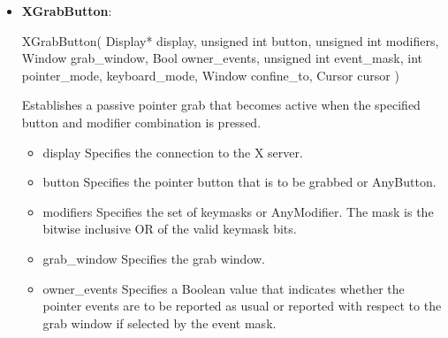 \documentclass{report}
\begin{document}
\begin{itemize}
\begin{cppcode}
{                    unsigned long serial;   /* # of last request processed by server */
                    Bool send_event;        /* true if this came from a SendEvent request */
                    Display *display;       /* Display the event was read from */
                    Window window;          /* ‘‘event’’ window it is reported relative to */
                    Window root;            /* root window that the event occurred on */
                    Window subwindow;       /* child window */
                    Time time;              /* milliseconds */
                    int x, y;               /* pointer x, y coordinates in event window */
                    int x_root, y_root;     /* coordinates relative to root */
                    unsigned int state;     /* key or button mask */
                    unsigned int button;    /* detail */
                    Bool same_screen;       /* same screen flag */
                } XButtonEvent;
                typedef XButtonEvent XButtonPressedEvent;
                typedef XButtonEvent XButtonReleasedEvent; 
            \end{cppcode}
        \item \textbf{XGrabButton}:
            \bigbreak \noindent 
            \begin{cppcode}
            XGrabButton(
                Display* display,
                unsigned int button,
                unsigned int modifiers,
                Window grab_window,
                Bool owner_events,
                unsigned int event_mask,
                int pointer_mode, keyboard_mode,
                Window confine_to,
                Cursor cursor
            )
            \end{cppcode}
            \bigbreak \noindent
            Establishes a passive pointer grab that becomes active when the specified button and modifier combination is pressed.
            \begin{itemize}
                \item display Specifies the connection to the X server.
                \item button Specifies the pointer button that is to be grabbed or AnyButton.
                \item modifiers Specifies the set of keymasks or AnyModifier. The mask is the bitwise inclusive OR of the valid keymask bits.
                \item grab\_window Specifies the grab window.
                \item owner\_events Specifies a Boolean value that indicates whether the pointer events are to be reported as usual or reported with respect to the grab window if selected by the event mask.

\end{itemize}
\end{itemize}
\end{document}
